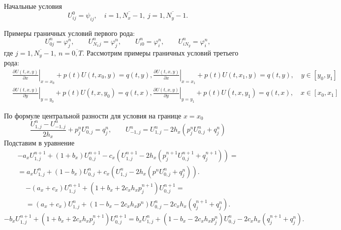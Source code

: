 \documentclass[a4paper,12pt]{article}
\begin{document}
Начальные условия
\begin{equation}
  \label{eq:2d-ic}
  U^0_{ij} = \psi_{ij}, \quad i = \overline {1, N_x-1}, \ j = \overline {1, N_y-1}.
\end{equation}

Примеры граничных условий первого рода:
\begin{equation*}
  \label{eq:2d-bc1}
  U^n_{0j} = \varphi_j^n, \qquad U^n_{N_x j} = \varphi_j^n, \qquad  U^n_{i0} = \varphi_i^n, \qquad U^n_{i N_y} = \varphi_i^n,
\end{equation*}
где $j = \overline {1, N_y-1}, \ n = \overline{0,T}$.
Рассмотрим примеры граничных условий третьего рода:
\begin{align*}
  &\left. \frac{ \partial U(t,x,y) }{\partial x} \right|_{x = x_0} +
    p(t) U(t, x_0, y) = q(t, y),
    \left. \frac{ \partial U(t,x,y) }{\partial x} \right|_{x = x_1} +
    p(t) U(t, x_1, y) = q(t, y), \quad y \in [y_0,y_1] \\
  &\left. \frac{ \partial U(t,x,y) }{\partial y} \right|_{y = y_0} +
    p(t) U(t, x, y_0)= q(t, x),
    \left. \frac{ \partial U(t,x,y) }{\partial y} \right|_{y = y_1} +
    p(t) U(t, x, y_1)= q(t, x), \quad x \in [x_0,x_1]
\end{align*}

По формуле центральной разности для условия на границе $x = x_0$
\begin{equation*}
  \frac{U^{n}_{1,j} -  U^{n}_{-1,j}}{2 h_x} + p_j^n U^n_{0,j}  = q_j^{n}, \qquad
  U^{n}_{-1,j}  = U^{n}_{1,j} - 2 h_x \left( p_j^n U^n_{0,j} + q_j^{n} \right)
\end{equation*}
Подставим в уравнение
\begin{multline*}
  - a_x U^{n+1}_{1,j} + \left( 1 + b_x  \right) U^{n+1}_{0,j} - c_x \left( U^{n+1}_{1,j} - 2 h_x (p_j^{n+1} U^{n+1}_{0,j} + q_j^{n+1}) \right) = \\
  = a_x U^{n}_{1,j} + \left(1 - b_x \right) U^{n}_{0,j} + c_x \left(  U^{n}_{1,j} - 2 h_x (p^n U^{n}_{0,j} + q_j^{n}) \right).
\end{multline*}
\begin{multline*}
  - (a_x + c_x) U^{n+1}_{1,j} + \left( 1 + b_x + 2 c_x h_x p^{n+1}_j \right) U^{n+1}_{0,j} = \\
  = (a_x + c_x) U^{n}_{1,j} + \left(1 - b_x - 2 c_x h_x p^{n} \right) U^{n}_{0,j} - 2 c_x h_x (q_j^{n+1} + q_j^{n}).
\end{multline*}
\begin{equation}
  - b_x U^{n+1}_{1,j} + \left( 1 + b_x  + 2 c_x h_x p^{n+1}_j \right) U^{n+1}_{0,j} =
  b_x U^{n}_{1,j} + \left(1 - b_x - 2 c_x h_x p^{n}_j \right) U^{n}_{0,j} - 2 c_x h_x (q_j^{n+1} + q_j^{n}).
\end{equation}
\end{document}
